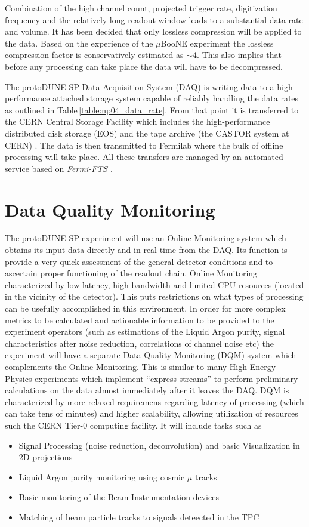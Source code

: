 \documentclass{PoS}
\newcommand{\pd}{protoDUNE\xspace}
\begin{document}
Combination of the high channel count, projected trigger rate, digitization frequency
and the relatively long readout window leads to a substantial data rate and volume. It has been decided that only
lossless compression will be applied to the data. Based on the experience of the $\mu$BooNE experiment \cite{uboone}
the lossless compression factor is conservatively estimated as $\sim$4. This also implies that before any processing can
take place the data will have to be decompressed.

The \pd-SP Data Acquisition System (DAQ) is writing data to a high performance attached storage system capable of reliably handling the data
rates as outlined in Table\,\ref{table:np04_data_rate}. From that point it is transferred to the CERN Central Storage
Facility which includes the high-performance distributed disk storage (EOS) and the tape archive (the CASTOR
system at CERN) \cite{castoreos}. The data is then transmitted to Fermilab where the bulk of offline processing
will take place.
All these transfers are managed by an automated service based on \textit{Fermi-FTS} \cite{sam,fts}.

\section{Data Quality Monitoring}
The protoDUNE-SP experiment will use an Online Monitoring system which obtains its input data directly
and in real time from the DAQ.
 Its function is provide a very quick assessment of the general detector conditions
and to ascertain proper functioning of the readout chain. Online Monitoring characterized by low latency, high bandwidth
and limited CPU resources (located in the vicinity of the detector). This puts restrictions on what types of processing
can be usefully accomplished in this environment.
In order for more complex metrics to be calculated and actionable information to be provided to the experiment operators
(such as estimations of the Liquid Argon purity, signal characteristics after noise reduction, correlations of channel noise etc) 
the experiment will have a separate Data Quality Monitoring (DQM) system which complements the Online Monitoring.
This is similar to many High-Energy Physics experiments which implement ``express streams'' to perform
preliminary calculations on the data almost immediately after it leaves the DAQ. DQM is characterized by more relaxed
requiremens regarding latency of processing (which can take tens of minutes) and higher scalability, allowing
utilization of resources such the CERN Tier-0 computing facility.
It will include tasks such as
\begin{itemize}
\item Signal Processing (noise reduction, deconvolution) and basic Visualization in 2D projections
\item Liquid Argon purity monitoring using cosmic $\mu$ tracks
\item Basic monitoring of the Beam Instrumentation devices
\item Matching of beam particle tracks to signals deteected in the TPC
\end{itemize}
\end{document}
